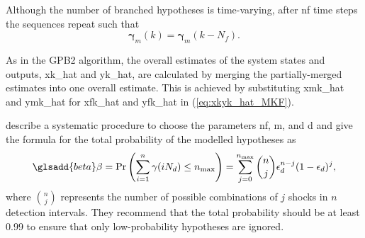 Although the number of branched hypotheses is time-varying, after \gls{nf} time steps the sequences repeat such that 
\begin{equation} \label{eq:rmkrmkmNf_SFex2}
	\mathbf{\gamma}_m(k) = \mathbf{\gamma}_m(k-N_f).
\end{equation}

As in the \gls{GPB2} algorithm, the overall estimates of the system states and outputs, \gls{xk_hat} and \gls{yk_hat}, are calculated by merging the partially-merged estimates into one overall estimate. This is achieved by substituting \gls{xmk_hat} and \gls{ymk_hat} for \gls{xfk_hat} and \gls{yfk_hat} in (\ref{eq:xkyk_hat_MKF}).

\cite{robertson_detection_1995} describe a systematic procedure to choose the parameters \gls{nf}, \gls{m}, and \gls{d} and give the formula for the total probability of the modelled hypotheses as
\begin{equation} \label{eq:p_gamma}
	\glsadd{beta}\beta=\operatorname{Pr}\left(\sum_{i=1}^{n} \gamma(i N_d) \leq n_\text{max}\right) = \sum_{j=0}^{n_\text{max}} \binom{n}{j} \epsilon_d^{n-j}(1-\epsilon_d)^{j},
\end{equation}
where $\binom{n}{j}$ represents the number of possible combinations of $j$ shocks in $n$ detection intervals. They recommend that the total probability should be at least 0.99 to ensure that only low-probability hypotheses are ignored.

